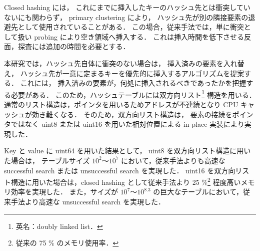 Closed hashing には，
これにまでに挿入したキーのハッシュ先とは衝突していないにも関わらず，
primary clustering により，
ハッシュ先が別の隣接要素の退避先として使用されていることがある．
この場合，従来手法では，単に衝突として扱い probing により空き領域へ挿入する．
これは挿入時間を低下させる反面，探査には追加の時間を必要とする．

本研究では，ハッシュ先自体に衝突のない場合は，
挿入済みの要素を入れ替え，
ハッシュ先が一意に定まるキーを優先的に挿入するアルゴリズムを提案する．
これには，
挿入済みの要素が，何処に挿入されるべきであったかを把握する必要がある．
このため，ハッシュテーブルには双方向リスト\footnote{英名：doubly linked list．} 構造を用いる．
通常のリスト構造は，ポインタを用いるためアドレスが不連続となり CPU キャッシュが効き難くなる．
そのため，双方向リスト構造は，
要素の接続をポインタではなく uint8 または uint16 を用いた相対位置による in-place 実装により実現した．

Key と value に uint64 を用いた結果として，
uint8 を双方向リスト構造に用いた場合は，
テーブルサイズ $10^2〜10^{7}$ において，従来手法よりも高速な successful search または unsuccessful search を実現した．
uint16 を双方向リスト構造に用いた場合は，closed hashing として従来手法より 25 \%\footnote{従来の 75 \% のメモリ使用率．} 程度高いメモリ効率を実現した．
また，サイズが $10^7〜10^{8.3}$ の巨大なテーブルにおいて，従来手法より高速な unsuccessful search を実現した．

